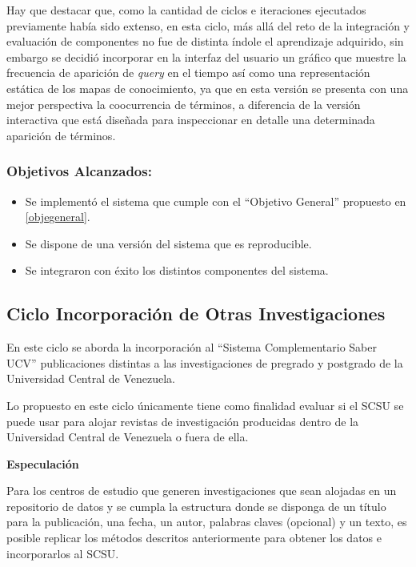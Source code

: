 \documentclass[
  12pt,
  openany]{book}
\begin{document}
Hay que destacar que, como la cantidad de ciclos e iteraciones ejecutados previamente había sido extenso, en esta ciclo, más allá del reto de la integración y evaluación de componentes no fue de distinta índole el aprendizaje adquirido, sin embargo se decidió incorporar en la interfaz del usuario un gráfico que muestre la frecuencia de aparición de \emph{query} en el tiempo así como una representación estática de los mapas de conocimiento, ya que en esta versión se presenta con una mejor perspectiva la coocurrencia de términos, a diferencia de la versión interactiva que está diseñada para inspeccionar en detalle una determinada aparición de términos.

\hypertarget{objetivos-alcanzados-2}{%
\subsubsection{Objetivos Alcanzados:}\label{objetivos-alcanzados-2}}

\begin{itemize}
\item
  Se implementó el sistema que cumple con el ``Objetivo General'' propuesto en \ref{objegeneral}.
\item
  Se dispone de una versión del sistema que es reproducible.
\item
  Se integraron con éxito los distintos componentes del sistema.
\end{itemize}

\newpage

\hypertarget{desarrollociclos6}{%
\subsection{Ciclo Incorporación de Otras Investigaciones}\label{desarrollociclos6}}

En este ciclo se aborda la incorporación al ``Sistema Complementario Saber UCV'' publicaciones distintas a las investigaciones de pregrado y postgrado de la Universidad Central de Venezuela.

Lo propuesto en este ciclo únicamente tiene como finalidad evaluar si el SCSU se puede usar para alojar revistas de investigación producidas dentro de la Universidad Central de Venezuela o fuera de ella.

\textbf{Especulación}

Para los centros de estudio que generen investigaciones que sean alojadas en un repositorio de datos y se cumpla la estructura donde se disponga de un título para la publicación, una fecha, un autor, palabras claves (opcional) y un texto, es posible replicar los métodos descritos anteriormente para obtener los datos e incorporarlos al SCSU.
\end{document}
